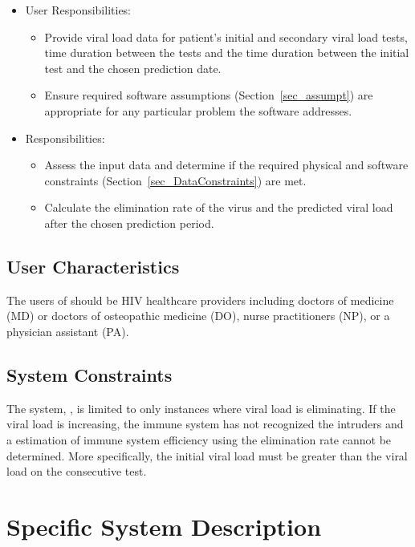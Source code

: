 \documentclass[12pt]{article}
\begin{document}
\begin{itemize}
\item User Responsibilities:
\begin{itemize}
\item Provide viral load data for patient's initial and secondary viral load 
tests, time duration between the tests and the time duration between the initial 
test and the chosen prediction date.
\item Ensure required software assumptions (Section~\ref{sec_assumpt}) are 
appropriate for any particular problem the software addresses.

\end{itemize}
\item \progname{} Responsibilities:
\begin{itemize}
\item Assess the input data and determine if the required physical and software 
constraints (Section~\ref{sec_DataConstraints}) are met.
\item Calculate the elimination rate of the virus and the predicted viral load 
after the chosen prediction period.
\end{itemize}
\end{itemize}

\subsection{User Characteristics} \label{SecUserCharacteristics}
The users of \progname{} should be HIV healthcare providers including 
doctors of medicine (MD) or doctors of osteopathic medicine (DO), nurse 
practitioners (NP), or a physician assistant (PA). \citep{cdc}


\subsection{System Constraints} \label{Sec_constraints}

The system, \progname{}, is limited to only instances where viral load 
is eliminating. If 
the viral load is increasing, the immune system has not recognized the intruders 
and a estimation of immune system efficiency using the elimination rate cannot be determined. More specifically, the 
initial viral load must be greater than the viral load on the consecutive test.

\section{Specific System Description}
\end{document}
